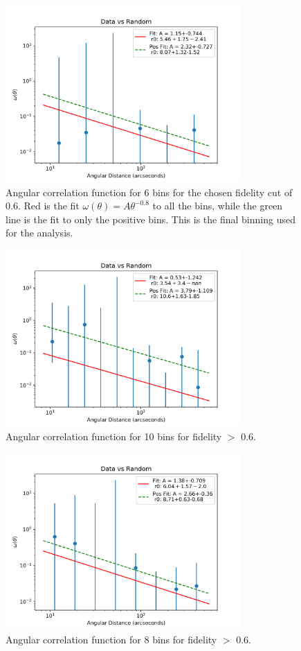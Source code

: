 \begin{figure}[!tbp]
\centering \includegraphics[width=90mm]{Data_vs_Random_10000_bin6_sn0_6_NFalse.png}
\caption{Angular correlation function for 6 bins for the chosen fidelity cut of 0.6. Red is the fit $\omega(\theta) = A\theta^{-0.8}$ to all the bins, while the green line is the fit to only the positive bins. This is the final binning used for the analysis. }
\label{fig:Angular_binnings}
\end{figure}

\begin{figure}[!tbp]
\centering \includegraphics[width=90mm]{Data_vs_Random_10000_bin10_sn0_6_NFalse.png}
\caption{Angular correlation function for 10 bins  for fidelity $>$ 0.6.}
\label{fig:Angular_bin_10}
\end{figure}

\begin{figure}[!tbp]
\centering \includegraphics[width=90mm]{Data_vs_Random_10000_bin8_sn0_6_NFalse.png}
\caption{Angular correlation function for 8 bins for fidelity $>$ 0.6.}
\label{fig:Angular_bin_8}
\end{figure}

